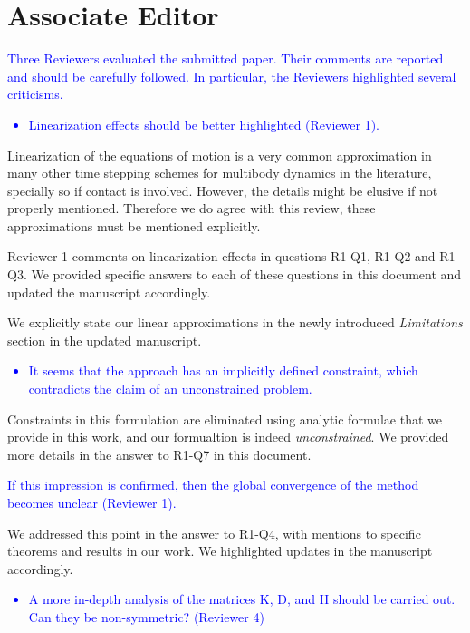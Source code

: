 \section{Associate Editor}
\label{sec:associate_editor}

\textcolor{blue}{Three Reviewers evaluated the submitted paper. Their comments
are reported and should be carefully followed. In particular, the Reviewers
highlighted several criticisms.}
\textcolor{blue}{\begin{itemize}
    \item Linearization effects should be better highlighted (Reviewer 1).
\end{itemize}}
Linearization of the equations of motion is a very common approximation in many
other time stepping schemes for multibody dynamics in the literature, specially
so if contact is involved. However, the details might be elusive if not properly
mentioned. Therefore we do agree with this review, these approximations must be
mentioned explicitly.

Reviewer 1 comments on linearization effects in questions R1-Q1, R1-Q2 and
R1-Q3. We provided specific answers to each of these questions in this document
and updated the manuscript accordingly. 

We explicitly state our linear approximations in the newly introduced
\emph{Limitations} section in the updated manuscript.

\textcolor{blue}{\begin{itemize}
    \item It seems that the approach has an implicitly defined constraint, which
    contradicts the claim of an unconstrained problem.
\end{itemize}}
Constraints in this formulation are eliminated using analytic formulae that we
provide in this work, and our formualtion is indeed \emph{unconstrained}. We
provided more details in the answer to R1-Q7 in this document.

\textcolor{blue}{If this impression is confirmed, then the global convergence of
the method becomes unclear (Reviewer 1).}

We addressed this point in the answer to R1-Q4, with mentions to specific theorems and
results in our work. We highlighted updates in the manuscript accordingly.

\textcolor{blue}{
\begin{itemize}
    \item A more in-depth analysis of the matrices K, D, and H should be
    carried out. Can they be non-symmetric? (Reviewer 4)
\end{itemize}}

